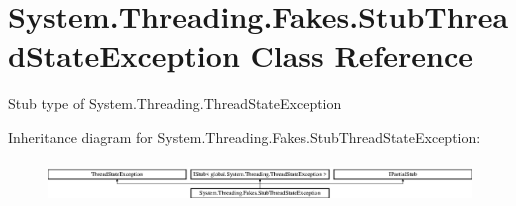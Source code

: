 \hypertarget{class_system_1_1_threading_1_1_fakes_1_1_stub_thread_state_exception}{\section{System.\-Threading.\-Fakes.\-Stub\-Thread\-State\-Exception Class Reference}
\label{class_system_1_1_threading_1_1_fakes_1_1_stub_thread_state_exception}
}


Stub type of System.\-Threading.\-Thread\-State\-Exception 


Inheritance diagram for System.\-Threading.\-Fakes.\-Stub\-Thread\-State\-Exception\-:\begin{figure}[H]
\begin{center}
\leavevmode
\includegraphics[height=1.104536cm]{class_system_1_1_threading_1_1_fakes_1_1_stub_thread_state_exception}
\end{center}
\end{figure}
